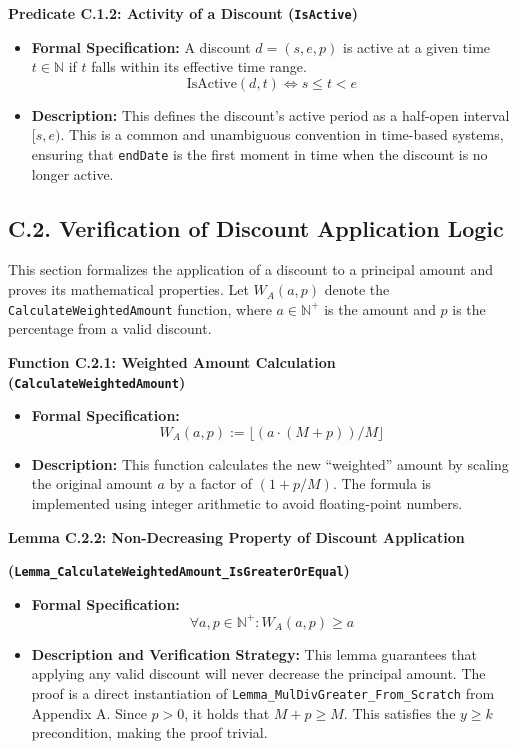 \documentclass[
  english,
  onecolumn]{article}
\providecommand{\tightlist}{%
  \setlength{\itemsep}{0pt}\setlength{\parskip}{0pt}}
\begin{document}
\textbf{Predicate C.1.2: Activity of a Discount (\texttt{IsActive})}

\begin{itemize}
\tightlist
\item
  \textbf{Formal Specification:} A discount \(d = (s, e, p)\) is active
  at a given time \(t \in \mathbb{N}\) if \(t\) falls within its
  effective time range. \[ \text{IsActive}(d, t) \iff s \le t < e \]
\item
  \textbf{Description:} This defines the discount's active period as a
  half-open interval \([s, e)\). This is a common and unambiguous
  convention in time-based systems, ensuring that \texttt{endDate} is
  the first moment in time when the discount is no longer active.
\end{itemize}

\subsection{C.2. Verification of Discount Application
Logic}\label{c.2.-verification-of-discount-application-logic}

This section formalizes the application of a discount to a principal
amount and proves its mathematical properties. Let \(W_A(a, p)\) denote
the \texttt{CalculateWeightedAmount} function, where
\(a \in \mathbb{N}^+\) is the amount and \(p\) is the percentage from a
valid discount.

\textbf{Function C.2.1: Weighted Amount Calculation
(\texttt{CalculateWeightedAmount})}

\begin{itemize}
\tightlist
\item
  \textbf{Formal Specification:}
  \[ W_A(a, p) := \lfloor (a \cdot (M + p)) / M \rfloor \]
\item
  \textbf{Description:} This function calculates the new ``weighted''
  amount by scaling the original amount \(a\) by a factor of
  \((1 + p/M)\). The formula is implemented using integer arithmetic to
  avoid floating-point numbers.
\end{itemize}

\textbf{Lemma C.2.2: Non-Decreasing Property of Discount Application}

\textbf{(\texttt{Lemma\_CalculateWeightedAmount\_IsGreaterOrEqual})}

\begin{itemize}
\tightlist
\item
  \textbf{Formal Specification:}
  \[ \forall a, p \in \mathbb{N}^+ : W_A(a, p) \ge a \]
\item
  \textbf{Description and Verification Strategy:} This lemma guarantees
  that applying any valid discount will never decrease the principal
  amount. The proof is a direct instantiation of
  \texttt{Lemma\_MulDivGreater\_From\_Scratch} from Appendix A. Since
  \(p > 0\), it holds that \(M + p \ge M\). This satisfies the
  \(y \ge k\) precondition, making the proof trivial.
\end{itemize}
\end{document}
